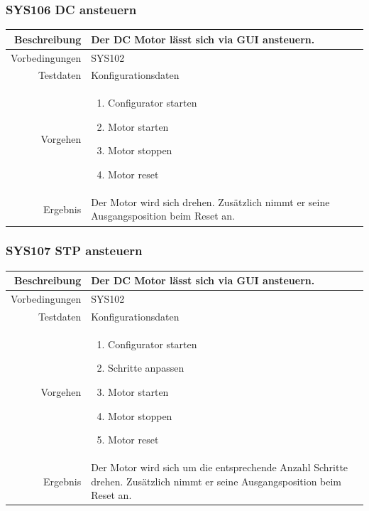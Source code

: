 \subsubsection{SYS106 DC ansteuern }
\begin{table}[h!]
	\renewcommand{\arraystretch}{1.5}
	\begin{tabular}{|r|p{14cm}|}
		\hline Beschreibung & Der DC Motor lässt sich via GUI ansteuern. \\ 
		\hline Vorbedingungen & SYS102 \\ 
		\hline Testdaten & Konfigurationsdaten \\ 
		\hline Vorgehen & 
		\begin{enumerate}
			\item Configurator starten
			\item Motor starten
			\item Motor stoppen
			\item Motor reset
		\end{enumerate} \\ 
		\hline Ergebnis & Der Motor wird sich drehen. Zusätzlich nimmt er seine Ausgangsposition beim Reset an.\\ 
		\hline 
	\end{tabular}
\end{table}

\subsubsection{SYS107 STP ansteuern}
\begin{table}[h!]
	\renewcommand{\arraystretch}{1.5}
	\begin{tabular}{|r|p{14cm}|}
		\hline Beschreibung & Der DC Motor lässt sich via GUI ansteuern. \\ 
		\hline Vorbedingungen & SYS102 \\ 
		\hline Testdaten & Konfigurationsdaten \\ 
		\hline Vorgehen & 
		\begin{enumerate}
			\item Configurator starten
			\item Schritte anpassen
			\item Motor starten
			\item Motor stoppen
			\item Motor reset
		\end{enumerate} \\ 
		\hline Ergebnis & Der Motor wird sich um die entsprechende Anzahl Schritte drehen. Zusätzlich nimmt er seine Ausgangsposition beim Reset an. \\ 
		\hline 
	\end{tabular}
\end{table}
